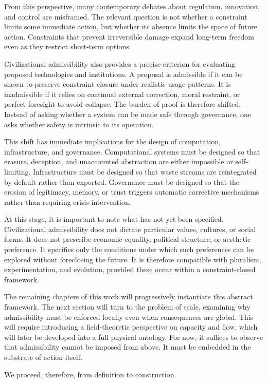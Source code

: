 \documentclass[12pt,oneside]{book}
\begin{document}
From this perspective, many contemporary debates about regulation, innovation, and control are misframed. The relevant question is not whether a constraint limits some immediate action, but whether its absence limits the space of future action. Constraints that prevent irreversible damage expand long-term freedom even as they restrict short-term options.

Civilizational admissibility also provides a precise criterion for evaluating proposed technologies and institutions. A proposal is admissible if it can be shown to preserve constraint closure under realistic usage patterns. It is inadmissible if it relies on continual external correction, moral restraint, or perfect foresight to avoid collapse. The burden of proof is therefore shifted. Instead of asking whether a system can be made safe through governance, one asks whether safety is intrinsic to its operation.

This shift has immediate implications for the design of computation, infrastructure, and governance. Computational systems must be designed so that erasure, deception, and unaccounted abstraction are either impossible or self-limiting. Infrastructure must be designed so that waste streams are reintegrated by default rather than exported. Governance must be designed so that the erosion of legitimacy, memory, or trust triggers automatic corrective mechanisms rather than requiring crisis intervention.

At this stage, it is important to note what has not yet been specified. Civilizational admissibility does not dictate particular values, cultures, or social forms. It does not prescribe economic equality, political structure, or aesthetic preference. It specifies only the conditions under which such preferences can be explored without foreclosing the future. It is therefore compatible with pluralism, experimentation, and evolution, provided these occur within a constraint-closed framework.

The remaining chapters of this work will progressively instantiate this abstract framework. The next section will turn to the problem of scale, examining why admissibility must be enforced locally even when consequences are global. This will require introducing a field-theoretic perspective on capacity and flow, which will later be developed into a full physical ontology. For now, it suffices to observe that admissibility cannot be imposed from above. It must be embedded in the substrate of action itself.

We proceed, therefore, from definition to construction.
\end{document}

